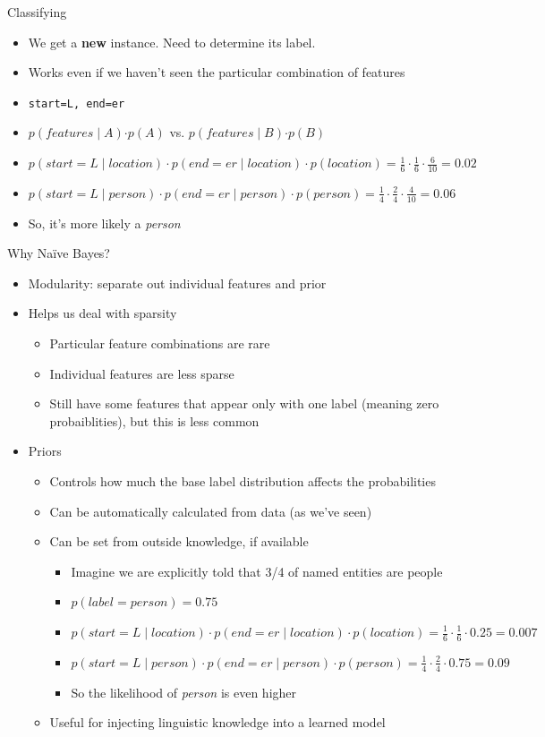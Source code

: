 \documentclass[11pt,letterpaper]{article}
\begin{document}
Classifying

\begin{itemize}
  \item We get a \textbf{new} instance.  Need to determine its label.
  \item Works even if we haven't seen the particular combination of features
  \item \texttt{start=L, end=er}
  \item $p(features \mid A)$$\cdot$$p(A)$ vs. $p(features \mid B)$$\cdot$$p(B)$
  \item $p(start=L \mid location) \cdot p(end=er \mid location) \cdot p(location) = \frac{1}{6} \cdot \frac{1}{6} \cdot \frac{6}{10} = 0.02$
  \item $p(start=L \mid person) \cdot p(end=er \mid person) \cdot p(person) = \frac{1}{4} \cdot \frac{2}{4} \cdot \frac{4}{10} = 0.06$
  \item So, it's more likely a \textit{person}
\end{itemize}


Why Na\"{i}ve Bayes?

\begin{itemize}
  \item Modularity: separate out individual features and prior
  \item Helps us deal with sparsity
    \begin{itemize}
      \item Particular feature combinations are rare
      \item Individual features are less sparse
      \item Still have some features that appear only with one label (meaning zero probaiblities), but this is less common
    \end{itemize}
  \item Priors
    \begin{itemize}
      \item Controls how much the base label distribution affects the probabilities
      \item Can be automatically calculated from data (as we've seen)
      \item Can be set from outside knowledge, if available
        \begin{itemize}
          \item Imagine we are explicitly told that 3/4 of named entities are people
          \item $p(label = person) = 0.75$
          \item $p(start=L \mid location) \cdot p(end=er \mid location) \cdot p(location) = \frac{1}{6} \cdot \frac{1}{6} \cdot 0.25 = 0.007$
          \item $p(start=L \mid person) \cdot p(end=er \mid person) \cdot p(person) = \frac{1}{4} \cdot \frac{2}{4} \cdot 0.75 = 0.09$
          \item So the likelihood of \textit{person} is even higher
        \end{itemize}
      \item Useful for injecting linguistic knowledge into a learned model
    \end{itemize}
\end{itemize}
\end{document}
